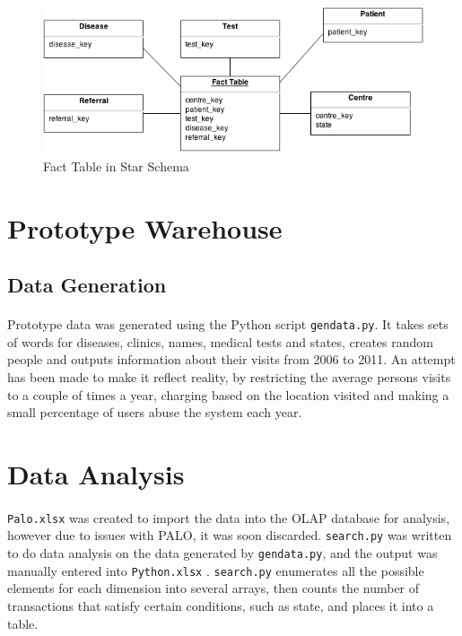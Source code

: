 \documentclass[a4paper,12pt,openbib]{article}
\begin{document}
\begin{figure}[ht!]
	\centering
	\includegraphics[width=15cm]{schema}
	\caption{Fact Table in Star Schema}
	\label{fig:schema}
\end{figure}

\section*{Prototype Warehouse}
\subsection*{Data Generation}
\paragraph{}
	Prototype data was generated using the Python script \texttt{gendata.py}.
	It takes sets of words for diseases, clinics, names, medical tests and states, creates random people and outputs information about their visits from 2006 to 2011.
	An attempt has been made to make it reflect reality, by restricting the average persons visits to a couple of times a year, charging based on the location visited and making a small percentage of users abuse the system each year.

\section*{Data Analysis}
\paragraph{}
	\texttt{Palo.xlsx} was created to import the data into the OLAP database for analysis, however due to issues with PALO, it was soon discarded.
	\texttt{search.py} was written to do data analysis on the data generated by \texttt{gendata.py}, and the output was manually entered into \texttt{Python.xlsx} .
	\texttt{search.py} enumerates all the possible elements for each dimension into several arrays, then counts the number of transactions that satisfy certain conditions, such as state, and places it into a table.
\end{document}
